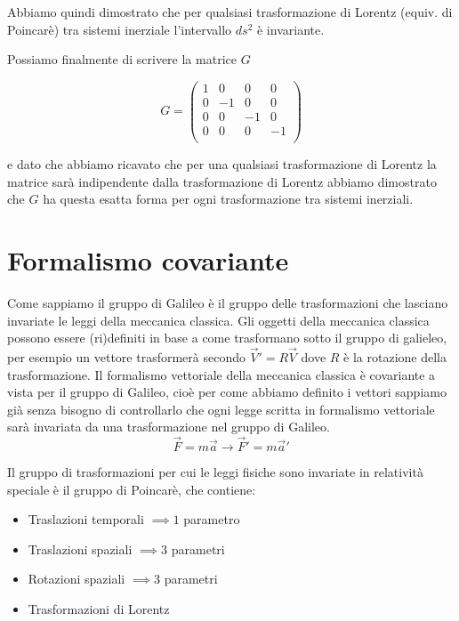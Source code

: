 \documentclass[12pt,a4paper,titlepage, twoside, openright]{book}
\numberwithin{equation}{chapter}
\begin{document}

Abbiamo quindi dimostrato che per qualsiasi trasformazione di Lorentz (equiv. di Poincarè) tra sistemi inerziale l'intervallo $ds^2$ è invariante.

Possiamo finalmente di scrivere la matrice $G$

\begin{equation}
G=\left(\begin{array}{cccc}
1 & 0 & 0 & 0 \\
0 & -1 & 0 & 0 \\
0 & 0 & -1 & 0 \\
0 & 0 & 0 & -1 \\
\end{array}
\right)
\end{equation}

e dato che abbiamo ricavato che per una qualsiasi trasformazione di Lorentz la matrice sarà indipendente dalla trasformazione di Lorentz abbiamo dimostrato che $G$ ha questa esatta forma per ogni trasformazione tra sistemi inerziali.

\chapter{Formalismo covariante}


Come sappiamo il gruppo di Galileo è il gruppo delle trasformazioni che lasciano invariate le leggi della meccanica classica. 
Gli oggetti della meccanica classica possono essere (ri)definiti in base a come trasformano sotto il gruppo di galieleo, per esempio un vettore trasformerà secondo $\vec{V}'=R\vec{V}$ dove $R$ è la rotazione della trasformazione.
Il formalismo vettoriale della meccanica classica è covariante a vista per il gruppo di Galileo, cioè per come abbiamo definito i vettori sappiamo già senza bisogno di controllarlo che ogni legge scritta in formalismo vettoriale sarà invariata da una trasformazione nel gruppo di Galileo.
\[
\vec{F}=m\vec{a} \longrightarrow \vec{F}'=m\vec{a}'
\]

Il gruppo di trasformazioni per cui le leggi fisiche sono invariate in relatività speciale è il gruppo di Poincarè, che contiene:
\begin{itemize}
\item Traslazioni temporali $\implies 1$ parametro
\item Traslazioni spaziali $\implies 3$ parametri
\item Rotazioni spaziali $\implies 3$ parametri
\item Trasformazioni di Lorentz
\end{itemize}
\end{document}
